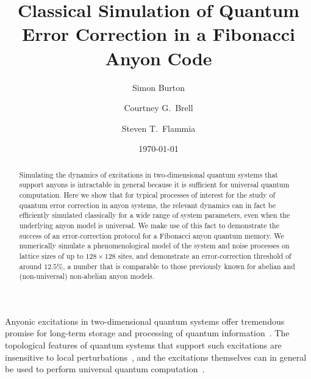 \documentclass[aps, prl, letterpaper, twocolumn, superscriptaddress, notitlepage]{revtex4-1}
\begin{document}
\title{Classical Simulation of Quantum Error Correction in a Fibonacci Anyon Code}

\author{Simon Burton}
\author{Courtney G.\ Brell}
\author{Steven T.\ Flammia}

\date{\today}

\begin{abstract}
Simulating the dynamics of excitations in two-dimensional quantum systems that support 
anyons is intractable in general because it is sufficient for universal quantum computation. 
Here we show that for typical processes of interest for the study of quantum error correction 
in anyon systems, the relevant dynamics can in fact be efficiently simulated classically for a 
wide range of system parameters, even when the underlying anyon model is universal. We 
make use of this fact to demonstrate the success of an error-correction protocol for a 
Fibonacci anyon quantum memory. We numerically simulate a phenomenological model of 
the system and noise processes on lattice sizes of up to $128\times128$ sites, and 
demonstrate an error-correction threshold of around $12.5\%$, a number that is comparable 
to those previously known for abelian and (non-universal) non-abelian anyon models.
\end{abstract}

\maketitle



Anyonic excitations in two-dimensional quantum systems offer tremendous promise for long-term storage and processing of quantum information~\cite{Kitaev2003}. The topological features of quantum systems that support such excitations are insensitive to local perturbations~\cite{Bravyi2010, *Bravyi2011a, *Michalakis2013}, and the excitations themselves can in general be used to perform universal quantum computation~\cite{Freedman2002, *Freedman2002b}. 
\end{document}
